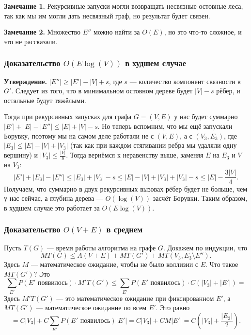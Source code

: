 \textbf{Замечание 1.} Рекурсивные запуски могли возвращать несвязные остовные леса, так как мы им могли дать несвязный граф, но результат будет связен.

\textbf{Замечание 2.} Множество $E''$ можно найти за $O(E)$, но это что-то сложное, и это не рассказали.

\subsubsection{Доказательство $O(E \log(V))$ в худшем случае}
\textbf{Утверждение.} $|E''| \ge |E'| - |V| + s$, где $s$ --- количество компонент связности в $G'$.
Следует из того, что в минимальном остовном дереве будет $|V| - s$ рёбер, и остальные будут тяжёлыми.

Тогда при рекурсивных запусках для графа $G = (V, E)$ у нас будет суммарно $|E'| + |E| - |E''| \le |E| + |V| - s$.
Но теперь вспомним, что мы ещё запускали Борувку, поэтому мы на самом деле работали не с $(V, E)$, а с $(V_3, E_3)$, где $|E_3| \le |E| - |V| + |V_3|$ (так как при каждом стягивании ребра мы удаляли одну вершину) и $|V_3| \le \frac{|V|}{8}$.
Тогда вернёмся к неравенству выше, заменяя $E$ на $E_3$ и $V$ на $V_3$:
\[
    |E'| + |E_3| - |E''| \le |E_3| + |V_3| - s \le |E| - |V| + |V_3| + |V_3| - s \le |E| - \frac{3|V|}{4}.
\]
Получаем, что суммарно в двух рекурсивных вызовах рёбер будет не больше, чем у нас сейчас, а глубина дерева --- $O(\log(V))$ засчёт Борувки.
Таким образом, в худшем случае это работает за $O(E \log(V))$.

\subsubsection{Доказательство $O(V + E)$ в среднем}
Пусть $T(G)$ --- время работы алгоритма на графе $G$.
Докажем по индукции, что
\[
    MT(G) \le A(V + E) + MT(G') + MT(V_3, E_3 \setminus E'').
\]
Здесь $M$ --- математическое ожидание, чтобы не было коллизии с $E$.
Что такое $MT(G')$? Это
\[
    \sum_{E'} P(E' \text{ появилось}) \cdot M'T(G') \le \sum_{E'} P(E' \text{ появилось}) \cdot C(|V_3| + |E'|) =
\]
Здесь $M'T(G')$ --- это математическое ожидание при фиксированном $E'$, а $MT(G')$ --- математическое ожидание по всем $E'$.
Это равно
\[
    = C|V_3| + C \sum_{E'} P(E' \text{ появилось}) |E'| = C|V_3| + CM|E'| = C \left(|V_3| + \frac{|E_3|}{2} \right).
\]


